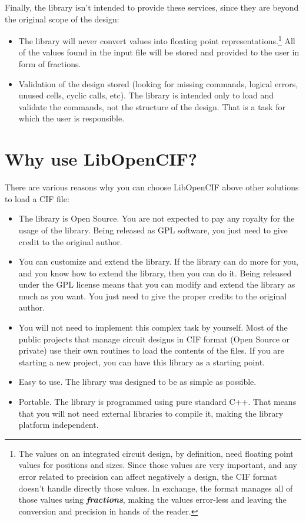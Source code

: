 \documentclass[11pt,twoside,openany,x11names,svgnames]{memoir}
\begin{document}
Finally, the library isn't intended to provide these services, since they are beyond the original scope of the design:

\begin{itemize}
	\item The library will never convert values into floating point representations.\footnote{The values on an integrated circuit design, by definition, need floating point values for positions and sizes. Since those values are very important, and any error related to precision can affect negatively a design, the CIF format doesn't handle directly those values. In exchange, the format manages all of those values using \textbf{\textit{fractions}}, making the values error-less and leaving the conversion and precision in hands of the reader.} All of the values found in the input file will be stored and provided to the user in form of fractions.
	\item Validation of the design stored (looking for missing commands, logical errors, unused cells, cyclic calls, etc). The library is intended only to load and validate the commands, not the structure of the design. That is a task for which the user is responsible.
\end{itemize}

\section{Why use LibOpenCIF?}\label{Why-use-LibOpenCIF}

There are various reasons why you can choose LibOpenCIF above other solutions to load a CIF file:

\begin{itemize}
	\item The library is Open Source. You are not expected to pay any royalty for the usage of the library. Being released as GPL software, you just need to give credit to the original author.
	\item You can customize and extend the library. If the library can do more for you, and you know how to extend the library, then you can do it. Being released under the GPL license means that you can modify and extend the library as much as you want. You just need to give the proper credits to the original author.
	\item You will not need to implement this complex task by yourself. Most of the public projects that manage circuit designs in CIF format (Open Source or private) use their own routines to load the contents of the files. If you are starting a new project, you can have this library as a starting point.
	\item Easy to use. The library was designed to be as simple as possible.
	\item Portable. The library is programmed using pure standard C++. That means that you will not need external libraries to compile it, making the library platform independent.
\end{itemize}
\end{document}
